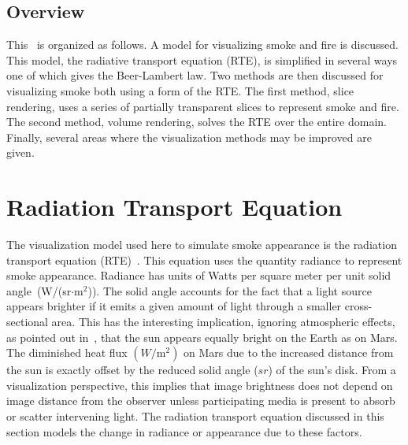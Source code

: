 \subsection{Overview}
This \paper\ is organized as follows.  A model for visualizing smoke and fire is discussed.  This model, the radiative transport equation (RTE), is simplified in several ways one of which gives the Beer-Lambert law.  Two methods are then discussed for visualizing smoke  both using a form of the RTE.  The first method, slice rendering,  uses a series of partially transparent slices to represent smoke and fire. The second method, volume rendering, solves the RTE over the entire domain. Finally, several areas where the visualization methods may be improved are given.


\section{Radiation Transport Equation}
The visualization model used here to simulate smoke appearance is the radiation transport equation (RTE)~\cite{Siegel:2001}.  This equation uses the quantity radiance to represent smoke appearance.  Radiance has units of Watts per square meter per unit solid angle~(W/(sr$\cdot$m$^2$)).  The solid angle accounts for the fact that a light source appears brighter if it emits a given amount of light through a smaller cross-sectional area.  This has the interesting implication, ignoring atmospheric effects, as pointed out in~\cite{dutre:2002}, that the sun appears equally bright on the Earth as on Mars.  The diminished heat flux $(W/\mbox{m}^2)$ on Mars due to the increased distance from the sun is exactly offset by the reduced solid angle ($sr$) of the sun's disk.  From a visualization perspective, this implies that image brightness does not depend on image distance from the observer unless  participating media is present to absorb or scatter  intervening light.  The radiation transport equation discussed in this section models the change in radiance or appearance due to these factors.

\newcommand{\siga}{ \sigma_a(x) }
\newcommand{\sigt}{ \sigma_t(x) }
\newcommand{\sigs}{ \sigma_s(x) }
\newcommand{\sigts}{ \sigma_t(s) }
\newcommand{\Le}{ C_e(x) }
\newcommand{\Lexo}{ C_e(x,\omega) }
\newcommand{\Lxo}{ C(x,\omega) }
\newcommand{\dLdx}{ \frac{dC}{dx}(x)}
\newcommand{\intf}[2]{ \exp\left({\int_{#1}^{#2} \sigts ds}\right) }
\newcommand{\intff}[2]{ {\int_{#1}^{#2} \sigts ds} }
\newcommand{\intmf}[2]{ \exp\left({-\int_{#1}^{#2} \sigts ds}\right) }
\newcommand{\intmff}[2]{ {-\int_#1^#2 \sigts ds} }

